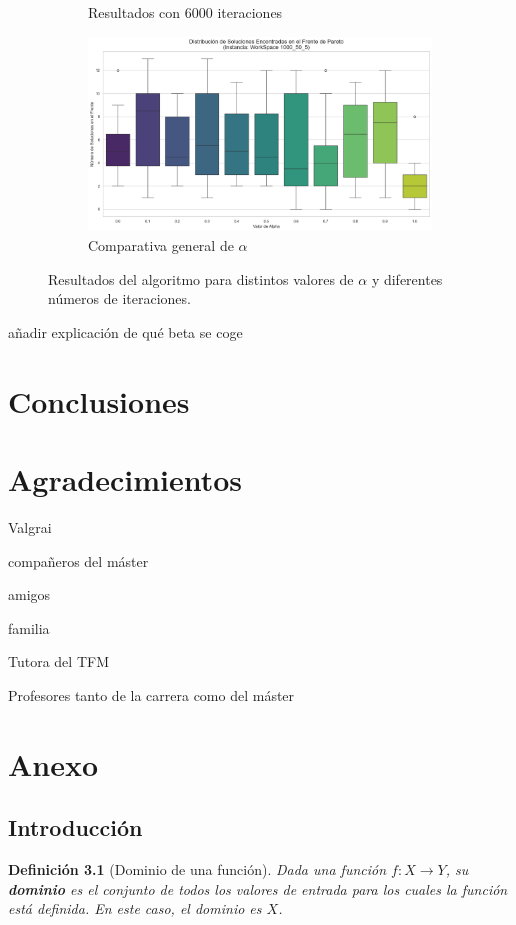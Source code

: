 \documentclass[12pt,a4paper]{book}
\newtheorem{defi}{Definición}[section]
\begin{document}
\begin{figure}[H]
\begin{subfigure}{0.45\textwidth}
        \caption{Resultados con 6000 iteraciones}
        \label{fig:beta_6000}
    \end{subfigure}
    \hfill
    \begin{subfigure}{0.45\textwidth}
        \centering
        \includegraphics[width=\linewidth]{images_finetuning/alphas}
        \caption{Comparativa general de $\alpha$}
        \label{fig:betas}
    \end{subfigure}
    \caption{Resultados del algoritmo para distintos valores de $\alpha$ y diferentes números de iteraciones.}
    \label{fig:resultados_beta}
\end{figure}

\color{red} añadir explicación de qué beta se coge \color{black}

\chapter{Conclusiones}


\chapter{Agradecimientos}
Valgrai

compañeros del máster

amigos

familia

Tutora del TFM

Profesores tanto de la carrera como del máster 

\chapter{Anexo}
\section{Introducción}
\begin{defi}[Dominio de una función]
Dada una función $f: X \to Y$, su \textbf{dominio} es el conjunto de todos los valores de entrada para los cuales la función está definida. En este caso, el dominio es $X$.
\end{defi}
\end{document}

